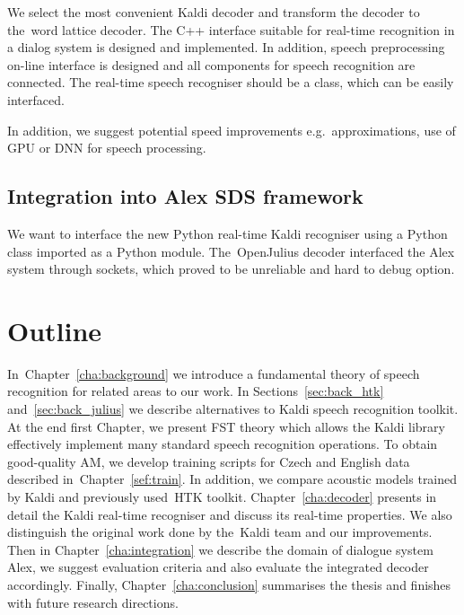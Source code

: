 We select the most convenient Kaldi decoder and transform the decoder to the~word lattice decoder. 
The C++ interface suitable for real-time recognition in a dialog system is designed and implemented.
In addition, speech preprocessing on-line interface is designed and all components for speech recognition
are connected.
The real-time speech recogniser should be a class, which can be easily interfaced.

In addition, we suggest potential speed improvements e.g.\ approximations, use of \ac{GPU} 
or \ac{DNN} for speech processing\cite{vesely2013sequencediscriminative}.

\subsection{Integration into Alex \ac{SDS} framework} 
\label{sub:integration}
We want to interface the new Python real-time Kaldi recogniser using a Python class imported as a Python module.
The~OpenJulius decoder interfaced the Alex system through sockets, which proved to be unreliable and hard to debug option.


\section*{Outline} 
In~Chapter~\ref{cha:background} we introduce a fundamental theory of speech recognition for related areas to our work.
In Sections~\ref{sec:back_htk} and~\ref{sec:back_julius} we describe alternatives to Kaldi speech recognition toolkit. 
At the end first Chapter, we present \ac{FST} theory which allows the Kaldi library effectively implement many standard speech recognition operations. 
To obtain good-quality \acl{AM}, we develop training scripts for Czech and English data described in~Chapter~\ref{sef:train}. 
In addition, we compare acoustic models trained by Kaldi and previously used~\ac{HTK} toolkit. 
Chapter~\ref{cha:decoder} presents in detail the Kaldi real-time recogniser and discuss its real-time properties.
We also distinguish the original work done by the~Kaldi team and our improvements. 
Then in Chapter~\ref{cha:integration} we describe the domain of dialogue system Alex, we suggest evaluation criteria and also evaluate the integrated decoder accordingly.
Finally, Chapter~\ref{cha:conclusion} summarises the thesis and finishes with future research directions.
